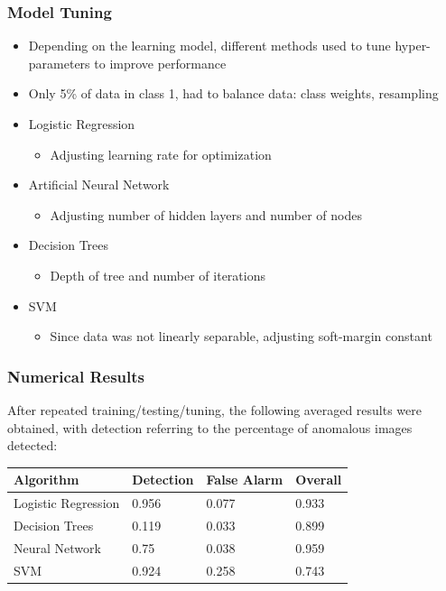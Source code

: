 \documentclass{beamer}
\begin{document}
\begin{frame}
\frametitle{Model Tuning}
\begin{itemize}
  \item Depending on the learning model, different methods used to tune hyper-parameters to improve performance
  \item Only 5\% of data in class 1, had to balance data: class weights, resampling
  \item Logistic Regression
  \begin{itemize}
    \item Adjusting learning rate for optimization
  \end{itemize}
  \item Artificial Neural Network
  \begin{itemize}
    \item Adjusting number of hidden layers and number of nodes
  \end{itemize}
  \item Decision Trees
  \begin{itemize}
    \item Depth of tree and number of iterations
  \end{itemize}
  \item SVM
  \begin{itemize}
    \item Since data was not linearly separable, adjusting soft-margin constant
  \end{itemize}
\end{itemize}
\end{frame}


\begin{frame}
\frametitle{Numerical Results}
After repeated training/testing/tuning, the following averaged results were obtained, with detection referring to the percentage of anomalous images detected:
\begin{table}[h!]
  \centering
  \begin{tabular}{|l|l|l|l|}
    \hline
    Algorithm & Detection & False Alarm & Overall  \\ \hline
    Logistic Regression & 0.956 & 0.077 & 0.933  \\ \hline
    Decision Trees & 0.119 & 0.033 & 0.899  \\ \hline
    Neural Network & 0.75 & 0.038 & 0.959  \\ \hline
    SVM & 0.924 & 0.258  & 0.743 \\ \hline
  \end{tabular}
\end{table}
\end{frame}
\end{document}
